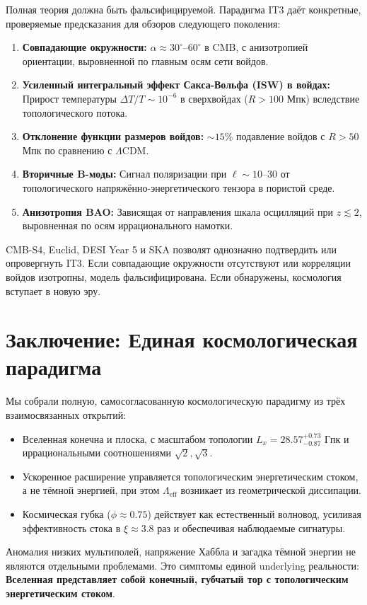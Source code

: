 \documentclass[12pt,a4paper]{article}
\begin{document}
Полная теория должна быть фальсифицируемой. Парадигма IT3 даёт конкретные, проверяемые предсказания для обзоров следующего поколения:
\begin{enumerate}
    \item \textbf{Совпадающие окружности:} $\alpha \approx 30^\circ\text{--}60^\circ$ в CMB, с анизотропией ориентации, выровненной по главным осям сети войдов.
    \item \textbf{Усиленный интегральный эффект Сакса-Вольфа (ISW) в войдах:} Прирост температуры $\Delta T/T \sim 10^{-6}$ в сверхвойдах ($R > 100$ Мпк) вследствие топологического потока.
    \item \textbf{Отклонение функции размеров войдов:} $\sim 15\%$ подавление войдов с $R > 50$ Мпк по сравнению с $\Lambda$CDM.
    \item \textbf{Вторичные B-моды:} Сигнал поляризации при $\ell \sim 10\text{--}30$ от топологического напряжённо-энергетического тензора в пористой среде.
    \item \textbf{Анизотропия BAO:} Зависящая от направления шкала осцилляций при $z \lesssim 2$, выровненная по осям иррационального намотки.
\end{enumerate}
CMB-S4, Euclid, DESI Year 5 и SKA позволят однозначно подтвердить или опровергнуть IT3. Если совпадающие окружности отсутствуют или корреляции войдов изотропны, модель фальсифицирована. Если обнаружены, космология вступает в новую эру.

\section{Заключение: Единая космологическая парадигма}

Мы собрали полную, самосогласованную космологическую парадигму из трёх взаимосвязанных открытий:
\begin{itemize}
    \item Вселенная конечна и плоска, с масштабом топологии $L_x = 28.57^{+0.73}_{-0.87}$ Гпк и иррациональными соотношениями $\sqrt{2}, \sqrt{3}$.
    \item Ускоренное расширение управляется топологическим энергетическим стоком, а не тёмной энергией, при этом $\Lambda_{\text{eff}}$ возникает из геометрической диссипации.
    \item Космическая губка ($\phi \approx 0.75$) действует как естественный волновод, усиливая эффективность стока в $\xi \approx 3.8$ раз и обеспечивая наблюдаемые сигнатуры.
\end{itemize}
Аномалия низких мультиполей, напряжение Хаббла и загадка тёмной энергии не являются отдельными проблемами. Это симптомы единой underlying реальности: \textbf{Вселенная представляет собой конечный, губчатый тор с топологическим энергетическим стоком}.
\end{document}
